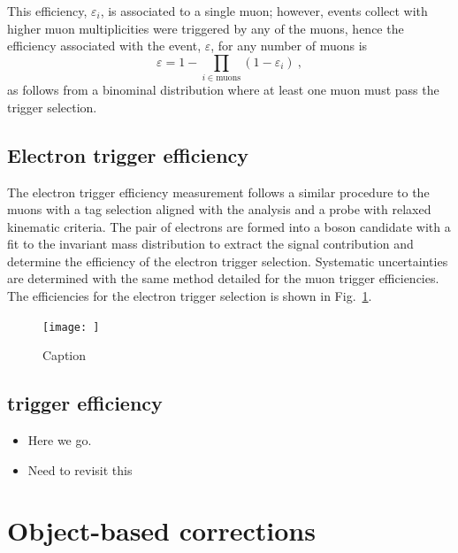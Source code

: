This efficiency, $\varepsilon_i$, is associated to a single muon; however,
events collect with higher muon multiplicities were triggered by any of the
muons, hence the efficiency associated with the event, $\varepsilon$, for any
number of muons is
%
\begin{equation}
    \varepsilon = 1 - \prod_{i\in\mathrm{muons}} ( 1 - \varepsilon_i )\ ,
\end{equation}
%
as follows from a binominal distribution where at least one muon must pass the
trigger selection.


\subsection{Electron trigger efficiency}

The electron trigger efficiency measurement follows a similar procedure to the
muons with a tag selection aligned with the analysis and a probe with relaxed
kinematic criteria. The pair of electrons are formed into a \PZ boson
candidate with a fit to the invariant mass distribution to extract the signal
contribution and determine the efficiency of the electron trigger selection.
Systematic uncertainties are determined with the same method detailed for the
muon trigger efficiencies. The efficiencies for the electron trigger selection
is shown in Fig.~\ref{fig:electron-trigger-efficiency}.

\begin{figure}[htbp]
    \centering
    \texttt{[image: ]}
    \caption{Caption}
    \label{fig:electron-trigger-efficiency}
\end{figure}


\subsection{\ptmiss trigger efficiency}

\begin{itemize}
    \item Here we go.
    \item Need to revisit this
\end{itemize}



\section{Object-based corrections}


